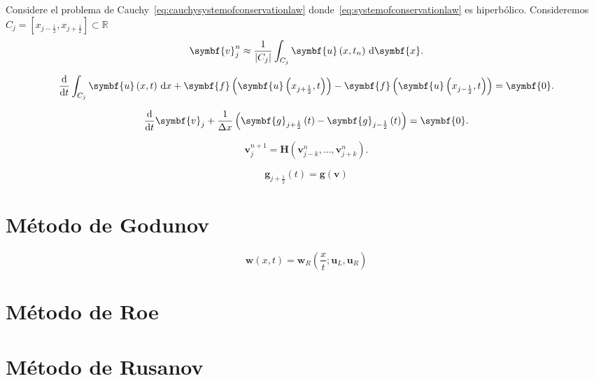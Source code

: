 Considere el problema de Cauchy~\eqref{eq:cauchysystemofconservationlaw}
donde~\eqref{eq:systemofconservationlaw} es hiperbólico.
Consideremos $C_{j}=\left[x_{j-\frac{1}{2}},x_{j+\frac{1}{2}}\right]\subset\mathbb{R}$
\begin{equation*}
	\symbf{v}^{n}_{j}\approx
	\frac{1}{\left|C_{j}\right|}
	\int_{C_{j}}
	\symbf{u}\left(x,t_{n}\right)\dl{\symbf{x}}.
\end{equation*}

\begin{equation*}
	\diff{}{t}
	\int_{C_{j}}
	\symbf{u}\left(x,t\right)\dl x+
	\symbf{f}\left(\symbf{u}\left(x_{j+\frac{1}{2}},t\right)\right)-
	\symbf{f}\left(\symbf{u}\left(x_{j-\frac{1}{2}},t\right)\right)=
	\symbf{0}.
\end{equation*}

\begin{equation*}
	\diff{}{t}\symbf{v}_{j}+
	\frac{1}{\Delta x}
	\left(
	\symbf{g}_{j+\frac{1}{2}}\left(t\right)-
	\symbf{g}_{j-\frac{1}{2}}\left(t\right)
	\right)=
	\symbf{0}.
\end{equation*}

\begin{equation*}
	\symbf{v}^{n+1}_{j}=
	\symbf{H}\left(\symbf{v}^{n}_{j-k},\dotsc,\symbf{v}^{n}_{j+k}\right).
\end{equation*}

\begin{equation*}
	\symbf{g}_{j+\frac{1}{2}}\left(t\right)=
	\symbf{g}\left(\symbf{v}\right)
\end{equation*}

\section{Método de Godunov}

\begin{equation*}
	\symbf{w}\left(x,t\right)=
	\symbf{w}_{R}
	\left(\frac{x}{t};\symbf{u}_{L},\symbf{u}_{R}\right)
\end{equation*}

\section{Método de Roe}

\section{Método de Rusanov}
